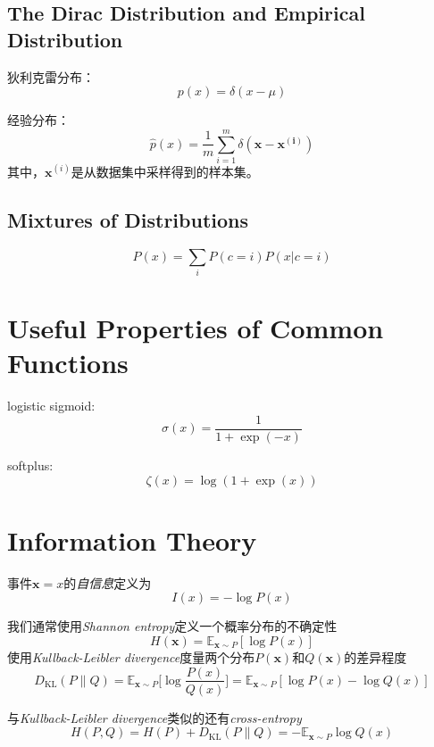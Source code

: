 \subsection{The Dirac Distribution and Empirical Distribution}

狄利克雷分布：
\begin{equation}
p(x)=\delta(x-\mu)
\end{equation}

经验分布：
\begin{equation}
\hat p(x)=\frac{1}{m}\sum_{i=1}^m\delta(\mathbf{x-x^{(i)}})
\end{equation}
其中，$\mathbf x^{(i)}$是从数据集中采样得到的样本集。

\subsection{Mixtures of Distributions}

\begin{equation}
P(x)=\sum_iP(c=i)P(x|c=i)
\end{equation}

\section{Useful Properties of Common Functions}

logistic sigmoid:
\begin{equation}
\sigma(x)=\frac{1}{1+\exp(-x)}
\end{equation}

softplus:
\begin{equation}
\zeta(x)=\log(1+\exp(x))
\end{equation}

\setcounter{section}{12}
\section{Information Theory}

事件$\mathbf x =x$的\textit{自信息}定义为
\begin{equation}
I(x)=-\log P(x)
\end{equation}

我们通常使用\textit{Shannon entropy}定义一个概率分布的不确定性
\begin{equation}
H(\mathbf x)=\mathbb E_{\mathbf x\sim P}[\log P(x)]
\end{equation}
使用\textit{Kullback-Leibler divergence}度量两个分布$P(\mathbf x)$和$Q(\mathbf x)$的差异程度
\begin{equation}
D_{\text{KL}}(P\|Q)=\mathbb E_{\mathbf x\sim P}\Big[\log\frac{P(x)}{Q(x)}\Big]=
\mathbb E_{\mathbf x\sim P}[\log P(x)-\log Q(x)]\end{equation}

与\textit{Kullback-Leibler divergence}类似的还有\textit{cross-entropy}
\begin{equation}
H(P,Q)=H(P)+D_{\text{KL}}(P\|Q)=-\mathbb E_{\mathbf x\sim P}\log Q(x)
\end{equation}